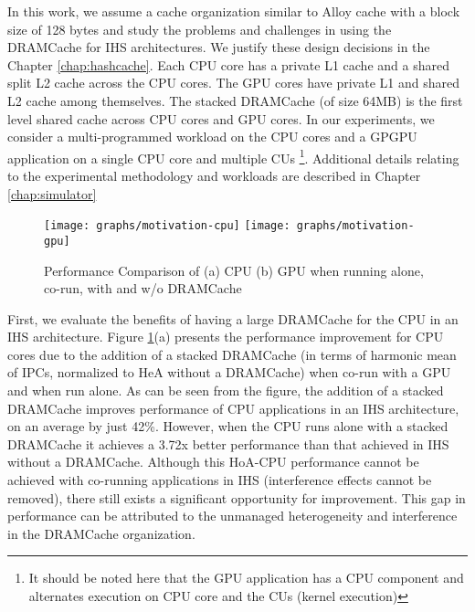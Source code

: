 \par In this work, we assume a cache organization similar to Alloy cache \cite{alloy} with a block size of 128 bytes and study the problems and challenges in using the DRAMCache for IHS architectures. We justify these design decisions in the Chapter \ref{chap:hashcache}. 
Each CPU core has a private L1 cache and a shared split L2 cache across the CPU cores. The GPU cores have private L1 and shared L2 cache among themselves.  
The stacked DRAMCache (of size 64MB) is the first level shared cache across CPU cores and GPU cores. In our experiments, we consider a multi-programmed workload on the CPU cores and a GPGPU application on a single CPU core and multiple CUs 
\footnote{It should be noted here that the GPU application has a CPU component and alternates execution on CPU core and the CUs (kernel execution)}. 
Additional details relating to the experimental methodology and workloads are described in Chapter \ref{chap:simulator}


\begin{figure}[htbp]
	\centering
	\texttt{[image: graphs/motivation-cpu]}
	\texttt{[image: graphs/motivation-gpu]}
	\caption{Performance Comparison of (a) CPU (b) GPU when running alone, co-run, with and w/o DRAMCache}
	\label{fig:motivation}
\end{figure}


\par First, we evaluate the benefits of having a large DRAMCache for the CPU in an IHS architecture. Figure \ref{fig:motivation}(a) presents the performance improvement for CPU cores due to the addition of a stacked DRAMCache (in terms of harmonic mean of IPCs, normalized to HeA without a DRAMCache) when co-run with a GPU and when run alone.
As can be seen from the figure, the addition of a stacked DRAMCache improves performance of CPU applications in an IHS architecture, on an average by just 42\%. However, when the CPU runs alone with a stacked DRAMCache it achieves a 3.72x better performance than that achieved in IHS without a DRAMCache. 
Although this HoA-CPU performance cannot be achieved with co-running applications in IHS (interference effects cannot be removed), there still exists a significant opportunity for improvement.
This gap in performance can be attributed to the unmanaged heterogeneity and interference in the DRAMCache organization.

